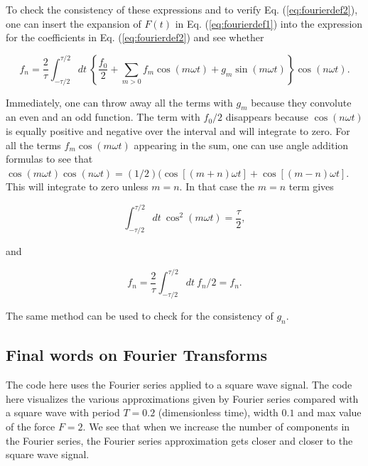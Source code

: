 \documentclass[%
oneside,                 %
final,                   %
10pt]{article}
\begin{document}
To check the consistency of these expressions and to verify
Eq. (\ref{eq:fourierdef2}), one can insert the expansion of $F(t)$ in
Eq. (\ref{eq:fourierdef1}) into the expression for the coefficients in
Eq. (\ref{eq:fourierdef2}) and see whether

\[
f_n=\frac{2}{\tau}\int_{-\tau/2}^{\tau/2} dt~\left\{\frac{f_0}{2}+\sum_{m>0}f_m\cos(m\omega t)+g_m\sin(m\omega t)\right\}\cos(n\omega t).
\]

Immediately, one can throw away all the terms with $g_m$ because they
convolute an even and an odd function. The term with $f_0/2$
disappears because $\cos(n\omega t)$ is equally positive and negative
over the interval and will integrate to zero. For all the terms
$f_m\cos(m\omega t)$ appearing in the sum, one can use angle addition
formulas to see that $\cos(m\omega t)\cos(n\omega
t)=(1/2)(\cos[(m+n)\omega t]+\cos[(m-n)\omega t]$. This will integrate
to zero unless $m=n$. In that case the $m=n$ term gives

\begin{equation}
\int_{-\tau/2}^{\tau/2}dt~\cos^2(m\omega t)=\frac{\tau}{2},
\end{equation}

and

\[
f_n=\frac{2}{\tau}\int_{-\tau/2}^{\tau/2} dt~f_n/2=f_n.
\]

The same method can be used to check for the consistency of $g_n$.

\subsection*{Final words on Fourier Transforms}

The code here uses the Fourier series applied to a 
square wave signal. The code here
visualizes the various approximations given by Fourier series compared
with a square wave with period $T=0.2$ (dimensionless time), width $0.1$ and max value of the force $F=2$. We
see that when we increase the number of components in the Fourier
series, the Fourier series approximation gets closer and closer to the
square wave signal.
\end{document}
